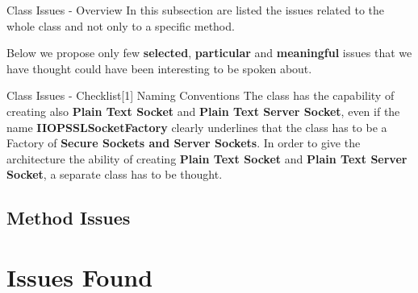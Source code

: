 \documentclass{../common/latex_classes/pdf_presentation}
\begin{document}
	\begin{frame}{Class Issues - Overview}
		In this subsection are listed the issues related to the whole class and not only to a specific method. \par Below we propose only few \textbf{selected}, \textbf{particular} and \textbf{meaningful} issues that we have thought could have been interesting to be spoken about.
	\end{frame}
	\begin{frame}{Class Issues - Checklist[1] Naming Conventions}
		The class has the capability of creating also \textbf{Plain Text Socket} and \textbf{Plain Text Server Socket}, even if the name \textbf{IIOPSSLSocketFactory} clearly underlines that the class has to be a Factory of \textbf{Secure Sockets and Server Sockets}. In order to give the architecture the ability of creating \textbf{Plain Text Socket} and \textbf{Plain Text Server Socket}, a separate class has to be thought.
	\end{frame}
	
	\subsection{Method Issues}
	
	\section{Issues Found}
	
\end{document}
